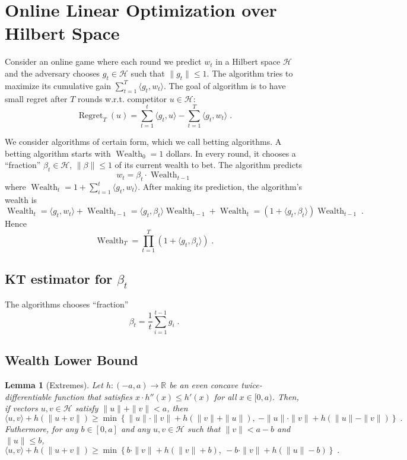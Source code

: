 \documentclass{article}
\DeclareMathOperator{\Regret}{Regret}
\DeclareMathOperator{\Wealth}{Wealth}
\newcommand{\R}{\mathbb{R}}  %
\renewcommand{\H}{\mathcal{H}}
\newtheorem{lemma}[theorem]{Lemma}
\begin{document}
\section{Online Linear Optimization over Hilbert Space}
\label{section:online-linear-optimization-hilbert-space}

Consider an online game where each round we predict $w_t$ in a Hilbert space
$\H$ and the adversary chooses $g_t \in \H$ such that $\|g_t\| \le 1$. The
algorithm tries to maximize its cumulative gain $\sum_{t=1}^T \langle g_t, w_t
\rangle$. The goal of algorithm is to have small regret after $T$ rounds w.r.t.
competitor $u \in \H$:
$$
\Regret_T(u) = \sum_{t=1}^t \langle g_t, u \rangle - \sum_{t=1}^T \langle g_t, w_t \rangle \; .
$$

We consider algorithms of certain form, which we call betting algorithms.  A
betting algorithm starts with $\Wealth_0 = 1$ dollars.
In every round, it chooses a ``fraction'' $\beta_t \in \H$, $\|\beta\| \le 1$
of its current wealth to bet. The algorithm predicts
$$
w_t = \beta_t \cdot \Wealth_{t-1}
$$
where $\Wealth_t = 1 + \sum_{i=1}^t \langle g_t, w_t \rangle$. After making its prediction,
the algorithm's wealth is
$$
\Wealth_t = \langle g_t, w_t \rangle + \Wealth_{t-1} = \langle g_t, \beta_t \rangle \Wealth_{t-1} + \Wealth_t = (1 + \langle g_t, \beta_t \rangle) \Wealth_{t-1} \; .
$$
Hence
$$
\Wealth_T = \prod_{t=1}^T (1 + \langle g_t, \beta_t \rangle) \; .
$$

\subsection{KT estimator for $\beta_t$}

The algorithms chooses ``fraction''
$$
\beta_t = \frac{1}{t} \sum_{i=1}^{t-1} g_i \; .
$$


\subsection{Wealth Lower Bound}

\begin{lemma}[Extremes]
\label{lemma:extremes}
Let $h:(-a,a) \to \R$ be an even concave twice-differentiable function that
satisfies $x \cdot h''(x) \le h'(x)$ for all $x \in [0,a)$. Then, if vectors
$u,v \in \H$ satisfy $\|u\| + \|v\| < a$, then
\begin{equation}
\label{equation:lemma-extremes-1}
\langle u, v \rangle + h(\|u + v\|) \ge \min \left\{ \|u\| \cdot \|v\| + h(\|v\| + \|u\|), \ - \|u\| \cdot \|v\| + h(\|u\| - \|v\|) \right\} \; .
\end{equation}
Futhermore, for any $b \in [0,a]$ and any $u, v \in \H$ such that $\|v\| < a - b$ and $\|u\| \le b$,
\begin{equation}
\label{equation:lemma-extremes-2}
\langle u, v \rangle + h(\|u + v\|) \ge \min \left\{ b \cdot \|v\| + h(\|v\| + b), \ - b \cdot \|v\| + h(\|u\| - b) \right\} \; .
\end{equation}
\end{lemma}
\end{document}
